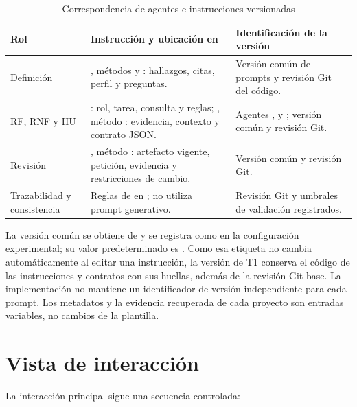 \begin{table}[H]
  \centering
  \caption{Correspondencia de agentes e instrucciones versionadas}
  \label{tab:agentes-prompts}
  \small
  \begin{tabularx}{\textwidth}{p{2.7cm}Yp{4.5cm}}
    \toprule
    Rol & Instrucción y ubicación en  & Identificación de la versión \\
    \midrule
    Definición & , métodos  y : hallazgos, citas, perfil y preguntas. & Versión común de prompts y revisión Git del código. \\
    RF, RNF y HU & : rol, tarea, consulta y reglas; , método : evidencia, contexto y contrato JSON. & Agentes ,  y ; versión común y revisión Git. \\
    Revisión & , método : artefacto vigente, petición, evidencia y restricciones de cambio. & Versión común y revisión Git. \\
    Trazabilidad y consistencia & Reglas de  en ; no utiliza prompt generativo. & Revisión Git y umbrales de validación registrados. \\
    \bottomrule
  \end{tabularx}
\end{table}

La versión común se obtiene de  y se registra como  en la configuración experimental; su valor predeterminado es . Como esa etiqueta no cambia automáticamente al editar una instrucción, la versión de T1 conserva el código de las instrucciones y contratos con sus huellas, además de la revisión Git base. La implementación no mantiene un identificador de versión independiente para cada prompt. Los metadatos y la evidencia recuperada de cada proyecto son entradas variables, no cambios de la plantilla.

\section{Vista de interacción}

La interacción principal sigue una secuencia controlada:

